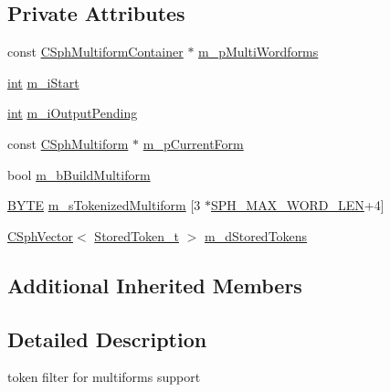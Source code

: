 \subsection*{Private Attributes}
\begin{DoxyCompactItemize}
\item 
const \hyperlink{structCSphMultiformContainer}{C\-Sph\-Multiform\-Container} $\ast$ \hyperlink{classCSphMultiformTokenizer_a9e487f015bd6e629a35786dbd85ff482}{m\-\_\-p\-Multi\-Wordforms}
\item 
\hyperlink{sphinxexpr_8cpp_a4a26e8f9cb8b736e0c4cbf4d16de985e}{int} \hyperlink{classCSphMultiformTokenizer_abf040d0f02a19dd5df5d30eebf3fcfdd}{m\-\_\-i\-Start}
\item 
\hyperlink{sphinxexpr_8cpp_a4a26e8f9cb8b736e0c4cbf4d16de985e}{int} \hyperlink{classCSphMultiformTokenizer_a58749e0c5c345829141454271be34300}{m\-\_\-i\-Output\-Pending}
\item 
const \hyperlink{structCSphMultiform}{C\-Sph\-Multiform} $\ast$ \hyperlink{classCSphMultiformTokenizer_a37d850185d9bdf79433c4d01db6d462e}{m\-\_\-p\-Current\-Form}
\item 
bool \hyperlink{classCSphMultiformTokenizer_a540a49eecd5eb11b964536a3932bc34d}{m\-\_\-b\-Build\-Multiform}
\item 
\hyperlink{sphinxstd_8h_a4ae1dab0fb4b072a66584546209e7d58}{B\-Y\-T\-E} \hyperlink{classCSphMultiformTokenizer_a646c1bcb629e8ab9fd655ef1fac1e35a}{m\-\_\-s\-Tokenized\-Multiform} \mbox{[}3 $\ast$\hyperlink{sphinx_8h_ab0f6d383751adea7c80ed4ff4c36532c}{S\-P\-H\-\_\-\-M\-A\-X\-\_\-\-W\-O\-R\-D\-\_\-\-L\-E\-N}+4\mbox{]}
\item 
\hyperlink{classCSphVector}{C\-Sph\-Vector}$<$ \hyperlink{structStoredToken__t}{Stored\-Token\-\_\-t} $>$ \hyperlink{classCSphMultiformTokenizer_a06711e9c0e5bdec2cdcdb2723ccb2530}{m\-\_\-d\-Stored\-Tokens}
\end{DoxyCompactItemize}
\subsection*{Additional Inherited Members}


\subsection{Detailed Description}
token filter for multiforms support 

